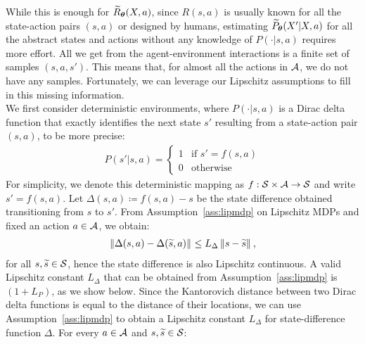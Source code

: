 While this is enough for $\widetilde{R}_{\boldsymbol{\theta}}(X, a)$, since $R(s, a)$ is usually known for all the state-action pairs $(s,a)$ or designed by humans, estimating $\widetilde{P}_{\boldsymbol{\theta}}(X'|X, a)$ for all the abstract states and actions without any knowledge of $P(\cdot|s, a)$ requires more effort. All we get from the agent-environment interactions is a finite set of samples $(s,a,s')$. This means that, for almost all the actions in $\mathcal{A}$, we do not have any samples. Fortunately, we can leverage our Lipschitz assumptions to fill in this missing information.\\
\newline
We first consider deterministic environments, where $P(\cdot|s, a)$ is a Dirac delta function that exactly identifies the next state $s'$ resulting from a state-action pair $(s,a)$, to be more precise:
\begin{align}
P(s'|s,a)= 
\begin{cases}
1 & \text{if } s'=f(s,a)\\
0 & \text{otherwise}
\end{cases}
\end{align}
For simplicity, we denote this deterministic mapping as $f:\mathcal{S}\times\mathcal{A}\to\mathcal{S}$ and write $s'=f(s,a)$.
Let $\Delta(s, a) \coloneqq f(s,a) - s$ be the state difference obtained transitioning from $s$ to $s'$. From Assumption~\ref{ass:lipmdp} on Lipschitz \ac{MDPs} and fixed an action $a\in\mathcal{A}$, we obtain:
%
\begin{align}\label{eq:deltas}
\left\|\Delta (s, a) - \Delta (\widetilde{s}, a)\right\|_{} \leq L_{\Delta}\left\|s - \widetilde{s}\right\|_{},
\end{align}
%
for all $s,\widetilde{s}\in\mathcal{S}$, hence the state difference is also Lipschitz continuous. A valid Lipschitz constant $L_{\Delta}$ that can be obtained from Assumption~\ref{ass:lipmdp} is $(1+L_{P})$, as we show below. Since the Kantorovich distance between two Dirac delta functions is equal to the distance of their locations, we can use Assumption~\ref{ass:lipmdp} to obtain a Lipschitz constant $L_{\Delta}$ for state-difference function $\Delta$. For every $a\in\mathcal{A}$ and $s,\widetilde{s}\in\mathcal{S}$:
